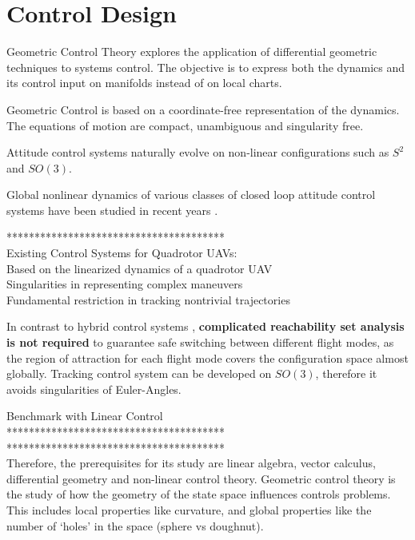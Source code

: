 \chapter{Control Design} \label{ch:control}

Geometric Control Theory explores the application of differential geometric techniques to systems control. The objective is to express both the dynamics and its control input on manifolds instead of on local charts.

Geometric Control is based on a coordinate-free representation of the dynamics. The equations of motion are compact, unambiguous and singularity free. 

Attitude control systems naturally evolve on non-linear configurations such as $ S^2 $ and $ SO(3) $. 

Global nonlinear dynamics of various classes of closed loop attitude control systems have been studied in recent years \cite{Chaturvedi2011a}.

***************************************\\


Existing Control Systems for Quadrotor UAVs:\\
Based on the linearized dynamics of a quadrotor UAV \\
Singularities in representing complex maneuvers \\
Fundamental restriction in tracking nontrivial trajectories

In contrast to hybrid control systems \cite{Gillula2010}, \textbf{complicated reachability set analysis is not required} to guarantee safe switching between different flight modes, as the region of attraction for each flight mode covers the configuration space almost globally.
Tracking control system can be developed on $ SO(3) $, therefore it avoids singularities of Euler-Angles.

Benchmark with Linear Control\\

***************************************\\



***************************************\\
Therefore, the prerequisites for its study are linear algebra, vector calculus, differential geometry and non-linear control theory.
Geometric control theory is the study of how the geometry of the state space influences controls problems. This includes local properties like curvature, and global properties like the number of `holes’ in the space (sphere vs doughnut).

